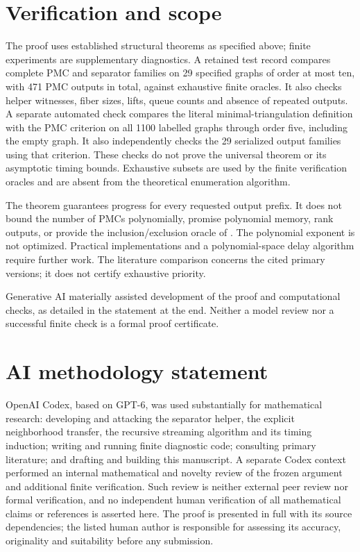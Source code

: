 \documentclass[acmsmall,12pt,screen,nonacm]{acmart}
\begin{document}
\section{Verification and scope}

The proof uses established structural theorems as specified above; finite
experiments are supplementary diagnostics. A retained test record compares
complete PMC and separator families on 29 specified graphs of order at most
ten, with 471 PMC outputs in total, against exhaustive finite oracles.
It also checks helper witnesses, fiber sizes, lifts, queue counts and absence
of repeated outputs. A separate automated check compares the literal
minimal-triangulation definition with the PMC criterion on all 1100 labelled
graphs through order five, including the empty graph. It also independently
checks the 29 serialized output families using that criterion. These
checks do not prove the universal theorem or its asymptotic timing bounds.
Exhaustive subsets are used by the finite verification oracles and are absent
from the theoretical enumeration algorithm.

The theorem guarantees progress for every requested output prefix. It does
not bound the number of PMCs polynomially, promise polynomial memory, rank
outputs, or provide the inclusion/exclusion oracle of \cite{Kenig26}.
The polynomial exponent is not optimized. Practical implementations and a
polynomial-space delay algorithm require further work. The literature
comparison concerns the cited primary versions; it does not certify
exhaustive priority.

Generative AI materially assisted development of the proof and computational
checks, as detailed in the statement at the end. Neither a model review nor
a successful finite check is a formal proof certificate.

\clearpage
{}



\section*{AI methodology statement}
OpenAI Codex, based on GPT-6, was used substantially for mathematical research:
developing and attacking the separator helper, the explicit neighborhood
transfer, the recursive streaming algorithm and its timing induction;
writing and running finite diagnostic code; consulting primary literature;
and drafting and building this manuscript. A separate Codex context performed
an internal mathematical and novelty review of the frozen argument and
additional finite verification. Such review is neither external peer review
nor formal verification, and no independent human verification of all
mathematical claims or references is asserted here. The proof is presented
in full with its source dependencies; the listed human author is responsible
for assessing its accuracy, originality and suitability before any submission.
\end{document}
